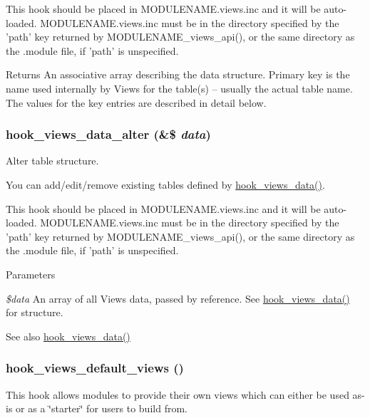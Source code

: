 This hook should be placed in MODULENAME.views.inc and it will be auto-\/loaded. MODULENAME.views.inc must be in the directory specified by the 'path' key returned by MODULENAME\_\-views\_\-api(), or the same directory as the .module file, if 'path' is unspecified.

\begin{DoxyReturn}{Returns}
An associative array describing the data structure. Primary key is the name used internally by Views for the table(s) – usually the actual table name. The values for the key entries are described in detail below. 
\end{DoxyReturn}
\hypertarget{group__views__hooks_ga6ae0bb0d2385e03c32b57625b6d35826}{
\subsubsection[{hook\_\-views\_\-data\_\-alter}]{\setlength{\rightskip}{0pt plus 5cm}hook\_\-views\_\-data\_\-alter (\&\$ {\em data})}}
\label{group__views__hooks_ga6ae0bb0d2385e03c32b57625b6d35826}
Alter table structure.

You can add/edit/remove existing tables defined by \hyperlink{group__views__hooks_ga227057901681e4a33e33c199c7a8c989}{hook\_\-views\_\-data()}.

This hook should be placed in MODULENAME.views.inc and it will be auto-\/loaded. MODULENAME.views.inc must be in the directory specified by the 'path' key returned by MODULENAME\_\-views\_\-api(), or the same directory as the .module file, if 'path' is unspecified.


\begin{DoxyParams}{Parameters}
\item[{\em \$data}]An array of all Views data, passed by reference. See \hyperlink{group__views__hooks_ga227057901681e4a33e33c199c7a8c989}{hook\_\-views\_\-data()} for structure.\end{DoxyParams}
\begin{DoxySeeAlso}{See also}
\hyperlink{group__views__hooks_ga227057901681e4a33e33c199c7a8c989}{hook\_\-views\_\-data()} 
\end{DoxySeeAlso}
\hypertarget{group__views__hooks_ga23edb74860682fa88f75cf94b97c2e15}{
\subsubsection[{hook\_\-views\_\-default\_\-views}]{\setlength{\rightskip}{0pt plus 5cm}hook\_\-views\_\-default\_\-views ()}}
\label{group__views__hooks_ga23edb74860682fa88f75cf94b97c2e15}
This hook allows modules to provide their own views which can either be used as-\/is or as a \char`\"{}starter\char`\"{} for users to build from.


